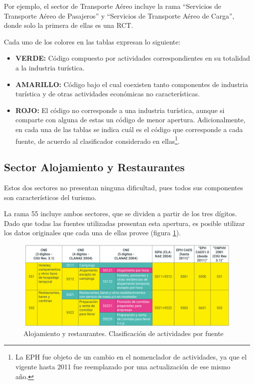 \documentclass[
  openany]{book}
\providecommand{\tightlist}{%
  \setlength{\itemsep}{0pt}\setlength{\parskip}{0pt}}
\begin{document}
Por ejemplo, el sector de Transporte Aéreo incluye la rama ``Servicios de Transporte Aéreo de Pasajeros'' y ``Servicios de Transporte Aéreo de Carga'', donde solo la primera de ellas es una RCT.

Cada uno de los colores en las tablas expresan lo siguiente:

\begin{itemize}
\tightlist
\item
  \textbf{VERDE:} Código compuesto por actividades correspondientes en su totalidad a la industria turística.
\item
  \textbf{AMARILLO:} Código bajo el cual coexisten tanto componentes de industria turística y de otras actividades económicas no características.
\item
  \textbf{ROJO:} El código no corresponde a una industria turística, aunque si comparte con alguna de estas un código de menor apertura. Adicionalmente, en cada una de las tablas se indica cuál es el código que corresponde a cada fuente, de acuerdo al clasificador considerado en ellas\footnote{La EPH fue objeto de un cambio en el nomenclador de actividades, ya que el vigente hasta 2011 fue reemplazado por una actualización de ese mismo año.}.
\end{itemize}

\hypertarget{sector-alojamiento-y-restaurantes}{%
\subsection{Sector Alojamiento y Restaurantes}\label{sector-alojamiento-y-restaurantes}}

Estos dos sectores no presentan ninguna dificultad, pues todos sus componentes son característicos del turismo.

La rama 55 incluye ambos sectores, que se dividen a partir de los tres dígitos.
Dado que todas las fuentes utilizadas presentan esta apertura, es posible utilizar los datos originales que cada una de ellas provee (figura \ref{fig:empleofuentes5}).

\begin{figure}

{\centering \includegraphics[width=1\linewidth]{imagenes/figura3.5} 

}

\caption{Alojamiento y restaurantes. Clasificación de actividades por fuente}\label{fig:empleofuentes5}
\end{figure}
\end{document}
